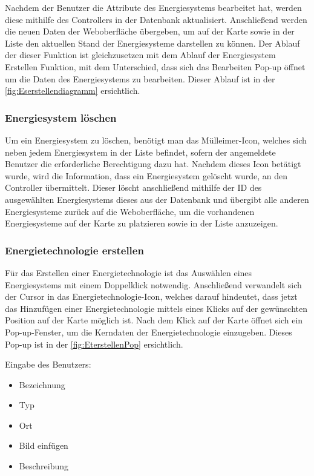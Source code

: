 Nachdem der Benutzer die Attribute des Energiesystems bearbeitet hat, werden diese mithilfe des Controllers in der Datenbank aktualisiert. Anschließend werden die neuen Daten der Weboberfläche übergeben, um auf der Karte sowie in der Liste den aktuellen Stand der Energiesysteme darstellen zu können. Der Ablauf der dieser Funktion ist gleichzusetzen mit dem Ablauf der Energiesystem Erstellen Funktion, mit dem Unterschied, dass sich das Bearbeiten Pop-up öffnet um die Daten des Energiesystems zu bearbeiten. Dieser Ablauf ist in der \autoref{fig:Eserstellendiagramm} ersichtlich.


\newpage
\subsubsection{Energiesystem löschen}
Um ein Energiesystem zu löschen, benötigt man das Mülleimer-Icon, welches sich neben jedem Energiesystem in der Liste befindet, sofern der angemeldete Benutzer die erforderliche Berechtigung dazu hat. 
Nachdem dieses Icon betätigt wurde, wird die Information, dass ein Energiesystem gelöscht wurde, an den Controller übermittelt. Dieser löscht anschließend mithilfe der ID des ausgewählten Energiesystems dieses aus der Datenbank und übergibt alle anderen Energiesysteme zurück auf die Weboberfläche, um die vorhandenen Energiesysteme auf der Karte zu platzieren sowie in der Liste anzuzeigen. 
 
 
\subsubsection{Energietechnologie erstellen}
Für das Erstellen einer Energietechnologie ist das Auswählen eines Energiesystems mit einem Doppelklick notwendig. Anschließend verwandelt sich der Cursor in das Energietechnologie-Icon, welches darauf hindeutet, dass jetzt das Hinzufügen einer Energietechnologie mittels eines Klicks auf der gewünschten Position auf der Karte möglich ist. Nach dem Klick auf der Karte öffnet sich ein Pop-up-Fenster, um die Kerndaten der Energietechnologie einzugeben. Dieses Pop-up ist in der \autoref{fig:EterstellenPop} ersichtlich. 


Eingabe des Benutzers:
\begin{itemize}
	\item Bezeichnung 
	\item Typ
	\item Ort
	\item Bild einfügen
	\item Beschreibung
\end{itemize}

